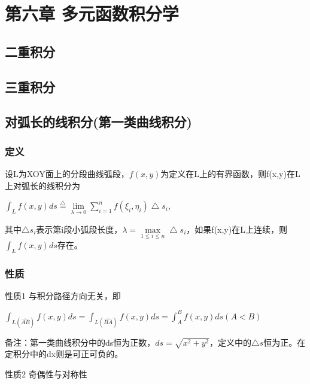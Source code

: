 \documentclass{ctexart}
\begin{document}
\section{第六章 多元函数积分学}

\subsection{二重积分}

\subsection{三重积分}

\subsection{对弧长的线积分(第一类曲线积分)}
\subsubsection{定义} 
设L为XOY面上的分段曲线弧段，$f(x,y)$为定义在L上的有界函数，则f(x,y)在L上对弧长的线积分为\\
\begin{center}
$\int_Lf(x,y)ds \overset{\bigtriangleup}{=} \lim\limits_{\lambda \to 0} \sum\limits_{i=1}^n f(\xi _i,\eta _i)\bigtriangleup s_i$,
\end{center}
\par
其中$\bigtriangleup s_i$表示第i段小弧段长度，$\lambda=\max\limits_{1\leq i\leq n} \bigtriangleup s_i$，如果f(x,y)在L上连续，则$\int _L f(x,y)ds$存在。 

\subsubsection{性质}
性质1 与积分路径方向无关，即
\begin{center}
$\int _{L(\widehat{AB})} f(x,y)ds=\int _{L(\widehat{BA})} f(x,y)ds=\int_A^Bf(x,y)ds(A<B)$\\
\end{center}
\par
备注：第一类曲线积分中的ds恒为正数，$ds=\sqrt{x^2+y^2}$，定义中的$\bigtriangleup s$恒为正。在定积分中的dx则是可正可负的。\\\par
性质2 奇偶性与对称性
\end{document}
